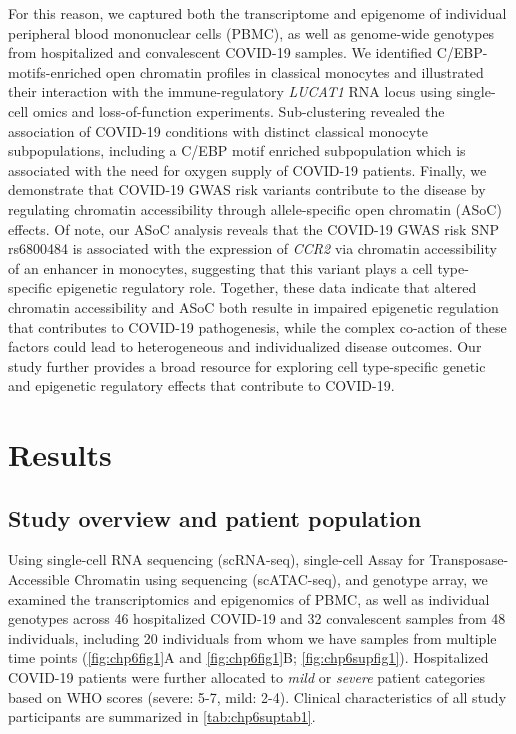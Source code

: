 \documentclass{book}
\begin{document}
\begin{refsection}
For this reason, we captured both the transcriptome and epigenome of individual peripheral blood mononuclear cells (PBMC), as well as genome-wide genotypes from hospitalized and convalescent COVID-19 samples.
We identified C/EBP-motifs-enriched open chromatin profiles in classical monocytes and illustrated their interaction with the immune-regulatory \textit{LUCAT1} RNA locus using single-cell omics and loss-of-function experiments.
Sub-clustering revealed the association of COVID-19 conditions with distinct classical monocyte subpopulations, including a C/EBP motif enriched subpopulation which is associated with the need for oxygen supply of COVID-19 patients.
Finally, we demonstrate that COVID-19 GWAS risk variants contribute to the disease by regulating chromatin accessibility through allele-specific open chromatin (ASoC) effects.
Of note, our ASoC analysis reveals that the COVID-19 GWAS risk SNP rs6800484 is associated with the expression of \textit{CCR2} via chromatin accessibility of an enhancer in monocytes, suggesting that this variant plays a cell type-specific epigenetic regulatory role.
Together, these data indicate that altered chromatin accessibility and ASoC both resulte in impaired epigenetic regulation that contributes to COVID-19 pathogenesis, while the complex co-action of these factors could lead to heterogeneous and individualized disease outcomes.
Our study further provides a broad resource for exploring cell type-specific genetic and epigenetic regulatory effects that contribute to COVID-19.

\section*{Results}
\subsection*{Study overview and patient population}
Using single-cell RNA sequencing (scRNA-seq), single-cell Assay for Transposase-Accessible Chromatin using sequencing (scATAC-seq), and genotype array, we examined the transcriptomics and epigenomics of PBMC, as well as individual genotypes across 46 hospitalized COVID-19 and 32 convalescent samples from 48 individuals, including 20 individuals from whom we have samples from multiple time points (\ref{fig:chp6fig1}A and \ref{fig:chp6fig1}B; \ref{fig:chp6supfig1}).
Hospitalized COVID-19 patients were further allocated to \textit{mild} or \textit{severe} patient categories based on WHO scores (severe: 5-7, mild: 2-4).
Clinical characteristics of all study participants are summarized in \ref{tab:chp6suptab1}. %


\end{refsection}
\end{document}
